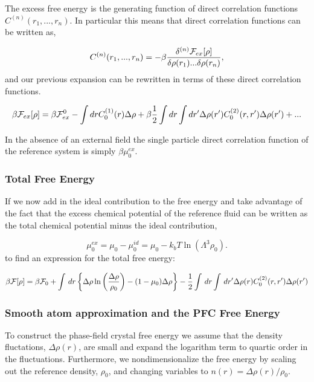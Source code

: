 The excess free energy is the generating function of direct correlation functions $C^(n)(r_1, ..., r_n)$.
In particular this means that direct correlation functions can be written as,

\begin{equation}
    C^{(n)}(r_1, ..., r_n) = -\beta \frac{\delta^{(n)}\mathcal{F}_{ex}[\rho]}{\delta\rho(r_1)...\delta\rho(r_n)},
\end{equation}
and our previous expansion can be rewritten in terms of these direct correlation functions.

\begin{equation}
    \beta\mathcal{F}_{ex}[\rho] = \beta\mathcal{F}_{ex}^0 - \int dr C^{(1)}_0(r) \Delta\rho
    + \beta\frac{1}{2}\int dr \int dr^\prime \Delta\rho(r^\prime)C^{(2)}_0(r, r^\prime)\Delta\rho(r^\prime) + ...
\end{equation}

In the absence of an external field the single particle direct correlation function of the reference system is simply $\beta\mu^{ex}_0$.

\subsubsection{Total Free Energy}
If we now add in the ideal contribution to the free energy and take advantage of the fact that the excess chemical potential of the reference fluid can be written as the total chemical potential minus the ideal contribution,

\begin{equation}
    \mu^{ex}_0 = \mu_0 - \mu^{id}_0 = \mu_0 - k_bT\ln(\Lambda^3\rho_0).
\end{equation}
to find an expression for the total free energy:

\begin{equation}
    \beta\mathcal{F}[\rho] = \beta\mathcal{F}_0 + \int\,dr \left\lbrace \Delta\rho \ln\left(\frac{\Delta\rho}{\rho_0}\right) - (1 - \mu_0)\Delta\rho \right\rbrace
    - \frac{1}{2}\int\,dr\int\,dr^\prime \Delta\rho(r) C^{(2)}_0(r, r^\prime) \Delta\rho(r^\prime)
\end{equation}

\subsubsection{Smooth atom approximation and the PFC Free Energy}

To construct the phase-field crystal free energy we assume that the density fluctations, $\Delta\rho(r)$, are small and expand the logarithm term to quartic order in the fluctuations.
Furthermore, we nondimensionalize the free energy by scaling out the reference density, $\rho_0$, and changing variables to $n(r) = \Delta\rho(r)/\rho_0$.


